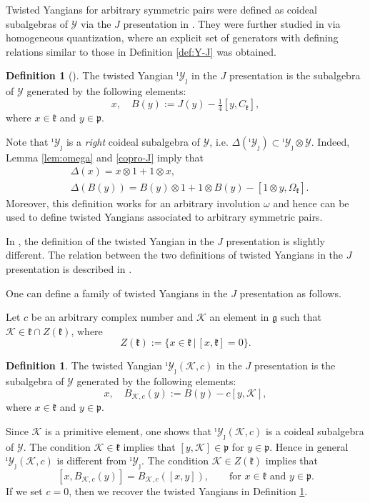 \documentclass[11pt,reqno]{amsart}
\numberwithin{equation}{section}
\theoremstyle{definition}
\newtheorem{dfn}[thm]{Definition}
\theoremstyle{remark}
\newcommand{\g}{\mathfrak{g}}
\newcommand{\Y}{{\mathscr{Y}}}
\newcommand{\YiJ}{{^\imath\mathscr{Y}_{\jmath}}}
\begin{document}
Twisted Yangians for arbitrary symmetric pairs were defined as coideal subalgebras of $\Y$ via the $J$ presentation in \cite{Mac02}. They were further studied in \cite{BR17} via homogeneous quantization, where an explicit set of generators with defining relations similar to those in Definition \ref{def:Y-J} was obtained.
\begin{dfn}[\cite{Mac02,BR17}]\label{def:tY-J}
The twisted Yangian $\YiJ$ in the $J$ presentation is the subalgebra of $\Y$ generated by the following elements:
\[
x,\quad B(y):=J(y)-\tfrac14[y,C_{\mathfrak k}],
\]
where $x\in \mathfrak k$ and $y\in\mathfrak p$. 
\end{dfn}
Note that $\YiJ$ is a \textit{right} coideal subalgebra of $\Y$, i.e. $\Delta(\YiJ)\subset \YiJ\otimes \Y$. Indeed, Lemma \ref{lem:omega} and \eqref{copro-J} imply that
\begin{align*}
&\Delta(x)=x\otimes 1+1\otimes x,\\
&\Delta(B(y))=B(y)\otimes 1+1\otimes B(y)-[1\otimes y,\Omega_{\mathfrak k}].
\end{align*}
Moreover, this definition works for an arbitrary involution $\omega$ and hence can be used to define twisted Yangians associated to arbitrary symmetric pairs.

In \cite[Theorem~5.5]{BR17}, the definition of the twisted Yangian in the $J$ presentation is slightly different. The relation between the two definitions of twisted Yangians in the $J$ presentation is described in \cite[\S2.3]{Lu26min}.

One can define a family of twisted Yangians in the $J$ presentation as follows. 

Let $c$ be an arbitrary complex number and $\mathscr K$ an element in $\g$ such that $\mathscr K\in \mathfrak k\cap Z(\mathfrak k)$, where 
$$Z(\mathfrak k):=\{x\in \mathfrak k\,|\,[x,\mathfrak k]=0\}.$$

\begin{dfn}\label{def:tY-J2}
The twisted Yangian $\YiJ(\mathscr K,c)$ in the $J$ presentation is the subalgebra of $\Y$ generated by the following elements:
\[
x,\quad B_{\mathscr K,c}(y):=B(y)-c[y,\mathscr K],
\]
where $x\in \mathfrak k$ and $y\in\mathfrak p$. 
\end{dfn}

Since $\mathscr K$ is a primitive element, one shows that $\YiJ(\mathscr K,c)$ is a coideal subalgebra of $\Y$. The condition $\mathscr K\in \mathfrak k$ implies that $[y,\mathscr K]\in \mathfrak p$ for $y\in \mathfrak p$. Hence in general $\YiJ(\mathscr K,c)$ is different from $\YiJ$. The condition $\mathscr K\in Z(\mathfrak k)$ implies that 
$$
[x,B_{\mathscr K,c}(y)]=B_{\mathscr K,c}([x,y]),\qquad \text{for $x\in \mathfrak k$ and $y\in \mathfrak p$.}
$$
If we set $c=0$, then we recover the twisted Yangians in Definition \ref{def:tY-J}.
\end{document}
